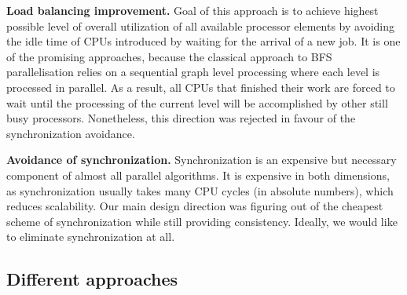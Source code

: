 \documentclass[letterpaper]{article}
\begin{document}
			\textbf{Load balancing improvement.} 
			Goal of this approach is to achieve highest possible level of overall utilization of all available processor elements by avoiding the idle time of CPUs introduced by waiting for the arrival of a new job.
			It is one of the promising approaches, because the classical approach to BFS parallelisation relies on a sequential graph level processing where each level is processed in parallel.
			As a result, all CPUs that finished their work are forced to wait until the processing of the current level will be accomplished by other still busy processors.
			Nonetheless, this direction was rejected in favour of the synchronization avoidance. 
			
			\textbf{Avoidance of synchronization.}
			Synchronization is an expensive but necessary component of almost all parallel algorithms.
			It is expensive in both dimensions, as synchronization usually takes many CPU cycles (in absolute numbers), which reduces scalability. 	%
			Our main design direction was figuring out of the cheapest scheme of synchronization while still providing consistency.
			Ideally, we would like to eliminate synchronization at all.
			
			

	
		
		\subsection{Different approaches}\label{sec:approaches}
		
		
\end{document}
